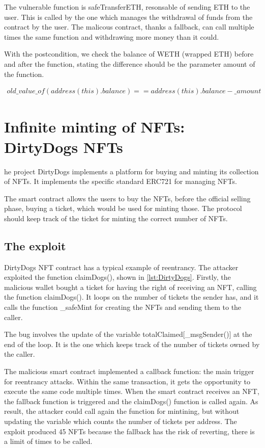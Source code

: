 The vulnerable function is safeTransferETH, resonsable of sending ETH to the user. This is called by the one which manages 
the withdrawal of funds from the contract by the user. The malicous contract, 
thanks a fallback, can call multiple times the same function and withdrawing more money than it could.

With the postcondition, we check the balance of WETH (wrapped ETH) before and after the function, 
stating the difference should be the parameter amount of the function.

\begin{equation}
    \begin{split}
        old\_value\_of(address(this).balance) == address(this).balance - \_amount
    \end{split}
\end{equation}



\section{Infinite minting of NFTs: DirtyDogs NFTs}   
\label{sec:Exploits:DirtyDogs}

he project DirtyDogs implements a platform for buying and minting its collection of NFTs.
It implements the specific standard ERC721 for managing NFTs. 

The smart contract allows the users to buy the NFTs, before the official selling phase, buying a ticket, which would be used for minting those.
The protocol should keep track of the ticket for minting the correct number of NFTs.

\subsection{The exploit}
\label{sec:DirtyDogs:Exploit}
DirtyDogs NFT contract has a typical example of reentrancy.
The attacker exploited the function claimDogs(), shown in \autoref{lst:DirtyDogs}.
Firstly, the malicious wallet bought a ticket for having the right of receiving an NFT, calling the function claimDogs().
It loops on the number of tickets the sender has, and it calls the function \_safeMint for creating the NFTs and sending them to 
the caller.

The bug involves the update of the variable totalClaimed[\_msgSender()] at the end of the loop. It is the one which 
keeps track of the number of tickets owned by the caller.

The malicious smart contract implemented a 
callback function: the main trigger for reentrancy attacks. 
Within the same transaction, it gets the opportunity to execute the same code multiple times. 
When the smart contract receives an NFT, the fallback function is triggered and the claimDogs() function is called again. 
As result, the attacker could call again the function for mintining, but without updating the variable which counts the number of tickets per address.
The exploit produced 45 NFTs because the fallback has the risk of reverting, 
there is a limit of times to be called.


